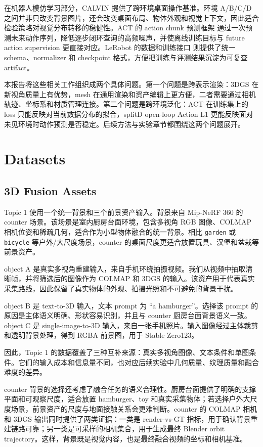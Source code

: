 \documentclass{article}
\begin{document}
	在机器人模仿学习部分，CALVIN 提供了跨环境桌面操作基准\cite{mees2022calvin}。环境 A/B/C/D 之间并非只改变背景图片，还会改变桌面布局、物体外观和视觉上下文，因此适合检验策略对视觉分布转移的稳健性。ACT 的 action chunk 预测框架\cite{chi2023act} 通过一次预测未来动作序列，降低逐步闭环查询的高频噪声，并使离线训练目标与 future action supervision 更直接对应。LeRobot 的数据和训练接口\cite{lerobot2024} 则提供了统一 schema、normalizer 和 checkpoint 格式，方便把训练与评测结果沉淀为可复查 artifact。

	本报告将这些相关工作组织成两个具体问题。第一个问题是跨表示渲染：3DGS 在新视角质量上有优势，mesh 在通用渲染和资产编辑上更方便，二者需要通过相机轨迹、坐标系和材质管理连接。第二个问题是跨环境泛化：ACT 在训练集上的 loss 只能反映对当前数据分布的拟合，splitD open-loop Action L1 更能反映面对未见环境时动作预测是否稳定。后续方法与实验章节都围绕这两个问题展开。

	\section{Datasets}

	\subsection{3D Fusion Assets}

	Topic 1 使用一个统一背景和三个前景资产输入。背景来自 Mip-NeRF 360 的 counter 场景。该场景是室内厨房台面环境，包含多视角 RGB 图像、COLMAP 相机位姿和稀疏几何，适合作为小型物体融合的统一背景。相比 \texttt{garden} 或 \texttt{bicycle} 等户外/大尺度场景，counter 的桌面尺度更适合放置玩具、汉堡和盆栽等前景资产。

	object A 是真实多视角重建输入，来自手机环绕拍摄视频。我们从视频中抽取清晰帧，并将筛选后的图像作为 COLMAP 和 3DGS 的输入。该资产用于代表真实采集路线，因此保留了真实物体的外观、拍摄光照和不可避免的背景干扰。

	object B 是 text-to-3D 输入，文本 prompt 为 ``a hamburger''。选择该 prompt 的原因是主体语义明确、形状容易识别，并且与 counter 厨房台面背景语义一致。object C 是 single-image-to-3D 输入，来自一张手机照片。输入图像经过主体裁剪和透明背景处理，得到 RGBA 前景图，用于 Stable Zero123。

	因此，Topic 1 的数据覆盖了三种互补来源：真实多视角图像、文本条件和单图条件。它们的输入成本和信息量不同，也对应后续实验中几何质量、纹理质量和融合难度的差异。

	counter 背景的选择还考虑了融合任务的语义合理性。厨房台面提供了明确的支撑平面和可观察尺度，适合放置 hamburger、toy 和真实采集物体；若选择户外大尺度场景，前景资产的尺度与地面接触关系会更难判断。counter 的 COLMAP 相机和 3DGS 输出同时提供了两类证据：一类是 render-vs-GT 指标，用于确认背景重建链路可靠；另一类是可采样的相机集合，用于生成最终 Blender orbit trajectory。这样，背景既是视觉内容，也是最终融合视频的坐标和相机基准。
\end{document}
